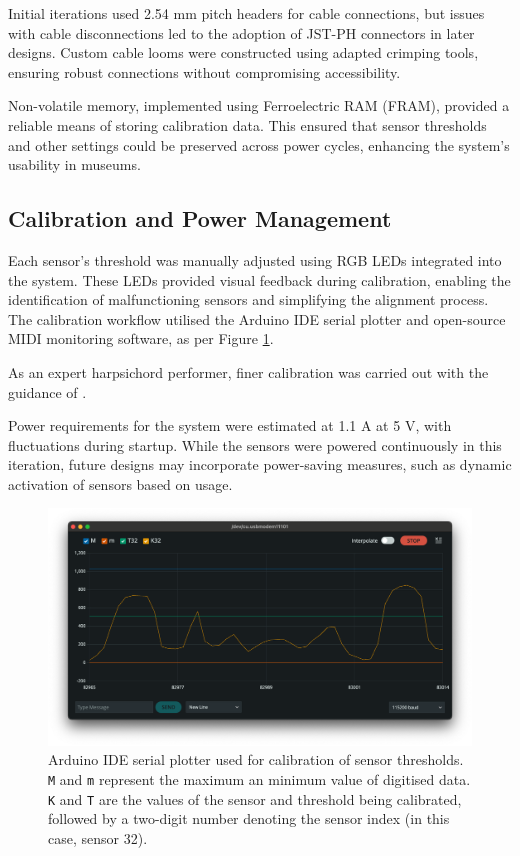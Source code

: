 Initial iterations used 2.54 mm pitch headers for cable connections, but issues with cable disconnections led to the adoption of JST-PH connectors in later designs. Custom cable looms were constructed using adapted crimping tools, ensuring robust connections without compromising accessibility.

Non-volatile memory, implemented using Ferroelectric RAM (FRAM), provided a reliable means of storing calibration data. This ensured that sensor thresholds and other settings could be preserved across power cycles, enhancing the system's usability in museums.

\subsection{Calibration and Power Management}\label{calibration}

Each sensor's threshold was manually adjusted using RGB LEDs integrated into the system. These LEDs provided visual feedback during calibration, enabling the identification of malfunctioning sensors and simplifying the alignment process. The calibration workflow utilised the Arduino IDE serial plotter and open-source MIDI monitoring software, as per Figure \ref{fig:serial_monitor}. 



As an expert harpsichord performer, finer calibration was carried out with the guidance of .

Power requirements for the system were estimated at 1.1 A at 5 V, with fluctuations during startup. While the sensors were powered continuously in this iteration, future designs may incorporate power-saving measures, such as dynamic activation of sensors based on usage.


\begin{figure}
    \centering
    \includegraphics[width=\linewidth]{src/images/serial_monitor.png}
    \caption{Arduino IDE serial plotter used for calibration of sensor thresholds. \texttt{M} and \texttt{m} represent the maximum an minimum value of digitised data. \texttt{K} and \texttt{T} are the values of the sensor and threshold being calibrated, followed by a two-digit number denoting the sensor index (in this case, sensor 32).}
    \label{fig:serial_monitor}
\end{figure}

